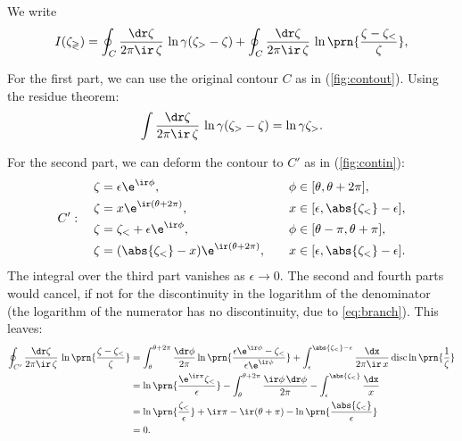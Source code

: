 \documentclass[12pt]{article}
\begin{document}
We write
%
\begin{equation}\label{eq:contoursplit}
  I(\zeta_\gtrless) = \oint_C \frac{\dr\zeta}{2\pi\ir\,\zeta}\, \ln\gamma(\zeta_>-\zeta) + \oint_C \frac{\dr\zeta}{2\pi\ir\,\zeta}\, \ln\prn{\frac{\zeta-\zeta_<}{\zeta}},
\end{equation}
%

For the first part, we can use the original contour $C$ as in (\ref{fig:contout}).
Using the residue theorem:
%
\begin{equation}\label{eq:intout}
  \int \frac{\dr\zeta}{2\pi\ir\,\zeta}\, \ln\gamma(\zeta_>-\zeta) = \ln \gamma\zeta_>.
\end{equation}
%

For the second part, we can deform the contour to $C'$ as in (\ref{fig:contin}):
%
\begin{equation}\label{eq:contout}
C': \quad
  \begin{aligned}
    \zeta &= \epsilon\e^{\ir\phi},                         & \phi &\in [\theta,\theta+2\pi], \\
    \zeta &= x \e^{\ir(\theta+2\pi)},                      & x    &\in [\epsilon,\abs{\zeta_<}-\epsilon], \\
    \zeta &= \zeta_< + \epsilon\e^{\ir\phi},               & \phi &\in [\theta-\pi,\theta+\pi], \\
    \zeta &= (\abs{\zeta_<}-x) \e^{\ir(\theta+2\pi)},\quad & x    &\in [\epsilon,\abs{\zeta_<}-\epsilon]. \\
  \end{aligned}
\end{equation}
%
The integral over the third part vanishes as $\epsilon\to0$.
The second and fourth parts would cancel, if not for the discontinuity in the logarithm of the denominator
(the logarithm of the numerator has no discontinuity, due to \eqref{eq:branch}).
This leaves:
%
\begin{equation}\label{eq:intin}
\begin{aligned}
  \oint_{C'} \frac{\dr\zeta}{2\pi\ir\,\zeta}\, \ln\prn{\frac{\zeta-\zeta_<}{\zeta}}
    &= \int_{\theta}^{\theta+2\pi}\frac{\dr\phi}{2\pi} \ln\prn{\frac{\epsilon\e^{\ir\phi}-\zeta_<}{\epsilon\e^{\ir\phi}}}
     + \int_{\epsilon}^{\abs{\zeta_<}-\epsilon} \frac{\dx}{2\pi\ir\,x} \operatorname{disc}\ln\prn{\frac{1}{\zeta}}\\
    &= \ln\prn{\frac{\e^{\ir\pi}\zeta_<}{\epsilon}}
     -  \int_{\theta}^{\theta+2\pi} \frac{\ir\phi\,\dr\phi}{2\pi}
     - \int_{\epsilon}^{\abs{\zeta_<}} \frac{\dx}{x}\\
    &= \ln\prn{\frac{\zeta_<}{\epsilon}} +\ir\pi
     - \ir(\theta+\pi)
     - \ln\prn{\frac{\abs{\zeta_<}}{\epsilon}}\\
    &= 0.
\end{aligned}
\end{equation}
%
\end{document}
